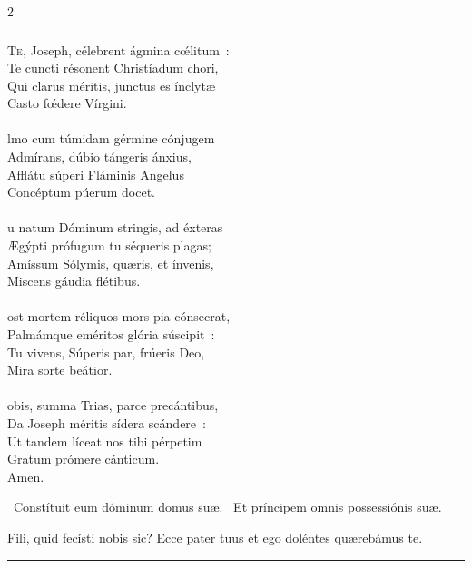 \documentclass[9pt,twoside]{extarticle}
\begin{document}
\begin{multicols}{2}
{\subsubsection*{\center {}}
\lettrine{T}e, Joseph, célebrent ágmina cœ́litum~:\\
Te cuncti résonent Christíadum chori,\\
Qui clarus méritis, junctus es ínclytæ\\
Casto fœ́dere Vírgini.\\
\\
lmo cum túmidam gérmine cónjugem\\
Admírans, dúbio tángeris ánxius,\\
Afflátu súperi Fláminis Angelus\\
Concéptum púerum docet.\\
\\
u natum Dóminum stringis, ad éxteras\\
Ægýpti prófugum tu séqueris plagas;\\
Amíssum Sólymis, quæris, et ínvenis,\\
Miscens gáudia flétibus.\\
\\
ost mortem réliquos mors pia cónsecrat,\\
Palmámque eméritos glória súscipit~:\\
Tu vivens, Súperis par, frúeris Deo,\\
Mira sorte beátior.\\
\\
obis, summa Trias, parce precántibus,\\
Da Joseph méritis sídera scándere~:\\
Ut tandem líceat nos tibi pérpetim\\
Gratum prómere cánticum.\\
Amen.

\begin{tightlist}{}
\item {}~Constítuit eum dóminum domus suæ. ~Et príncipem omnis possessiónis suæ.
\item {} Fili, quid fecísti nobis sic? Ecce pater tuus et ego doléntes quærebámus te.
\end{tightlist}

\begin{center}\textcolor{red}{\rule{\linewidth}{0.5pt}} \end{center}

}
\end{multicols}
\end{document}
